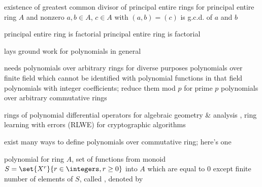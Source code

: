 \documentclass[17pt,landscape]{foils}
\begin{document}
{\begin{myproposition}{existence of greatest common divisor of principal entire rings}%
	for principal entire ring $A$
	and nonzero $a,b\in A$,
	$c\in A$ with $(a,b) = (c)$
	is g.c.d. of $a$ and $b$
\end{myproposition}

\begin{mytheorem}{principal entire ring is factorial}
	principal entire ring is factorial
\end{mytheorem}



%

%

\bit
\item
	lays ground work for polynomials in general

\vitem
	needs polynomials over arbitrary rings for diverse purposes
	\bit
	\vitem
		polynomials over finite field
		which cannot be identified with polynomial functions in that field%
	\vitem
		polynomials with integer coefficients;%
		reduce them mod $p$ for prime $p$
	\vitem
		polynomials over arbitrary commutative rings%

	\vitem
		rings of polynomial differential operators%
		for
		algebraic geometry \& analysis
	\eit
\vvitem
	\eg, ring learning with errors (RLWE)
		for cryptographic algorithms
\eit
\vfill



\bit
\item
	exist many ways to define polynomials over commutative ring;
	here's one
\eit

\begin{mydefinition}{polynomial}%
	for ring $A$,
	set of functions from monoid $S = \set{X^r}{r\in\integers, r\geq0}$
	into $A$
	which are equal to $0$
	except finite number of elements of $S$,
	called ,
	denoted by 
\end{mydefinition}

}
\end{document}
